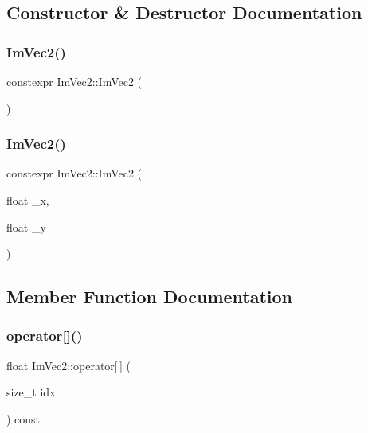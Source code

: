 \subsection{Constructor \& Destructor Documentation}
\mbox{\label{structImVec2_aa05c0d6514790be9e7510a1d5efe55b0}} 
\subsubsection{\texorpdfstring{Im\+Vec2()}{ImVec2()}\hspace{0.1cm}{\footnotesize\ttfamily [1/2]}}
{\footnotesize\ttfamily constexpr Im\+Vec2\+::\+Im\+Vec2 (\begin{DoxyParamCaption}{ }\end{DoxyParamCaption})\hspace{0.3cm}{\ttfamily [inline]}}

\mbox{\label{structImVec2_ac5df74030ad09fc4616b5191752f5381}} 
\subsubsection{\texorpdfstring{Im\+Vec2()}{ImVec2()}\hspace{0.1cm}{\footnotesize\ttfamily [2/2]}}
{\footnotesize\ttfamily constexpr Im\+Vec2\+::\+Im\+Vec2 (\begin{DoxyParamCaption}\item[{float}]{\+\_\+x,  }\item[{float}]{\+\_\+y }\end{DoxyParamCaption})\hspace{0.3cm}{\ttfamily [inline]}}



\subsection{Member Function Documentation}
\mbox{\label{structImVec2_ab9d53b9da1e51a5f38ba99bf5522c7f0}} 
\subsubsection{\texorpdfstring{operator[]()}{operator[]()}\hspace{0.1cm}{\footnotesize\ttfamily [1/2]}}
{\footnotesize\ttfamily float Im\+Vec2\+::operator\mbox{[}$\,$\mbox{]} (\begin{DoxyParamCaption}\item[{size\+\_\+t}]{idx }\end{DoxyParamCaption}) const\hspace{0.3cm}{\ttfamily [inline]}}

